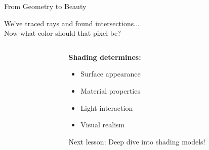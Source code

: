 \begin{frame}{From Geometry to Beauty}
    \begin{center}
        \large \textcolor{PrimaryColor}{We've traced rays and found intersections...}\\
        \vspace{0.5cm}
        \huge \textcolor{AccentColor}{Now what color should that pixel be?}
    \end{center}

    \begin{columns}
        \begin{column}{0.5\textwidth}
        \end{column}
        \begin{column}{0.5\textwidth}
            \textbf{Shading determines:}
            \begin{itemize}
                \item Surface appearance
                \item Material properties
                \item Light interaction
                \item Visual realism
            \end{itemize}

            \vspace{0.5cm}
            \alert{Next lesson:} Deep dive into shading models!
        \end{column}
    \end{columns}
\end{frame}

